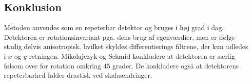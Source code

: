 \subsection{Konklusion}
Metoden anvendes som en repeterbar detektor og bruges i høj grad i dag. Detektoren er rotationsinvariant pga. dens brug af egenværdier, men er ifølge \cite{eval} stadig delvis anisotropisk, hvilket skyldes differentierings filtrene, der kun udledes i $x$ og $y$ retningen. Mikolajczyk og Schmid \cite{eval} konkludere at detektoren er særlig følsom over for rotation omkring 45 grader. De konkludere også at detektorens repeterbarhed falder drastisk ved skalaændringer.